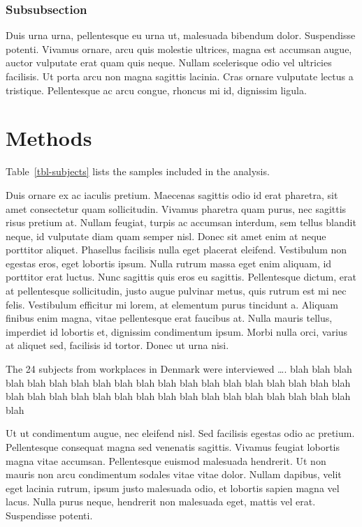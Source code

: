 \documentclass[
  a4paper,
]{scrbook}
\begin{document}
\subsection{Subsubsection}\label{subsubsection}

Duis urna urna, pellentesque eu urna ut, malesuada bibendum dolor.
Suspendisse potenti. Vivamus ornare, arcu quis molestie ultrices, magna
est accumsan augue, auctor vulputate erat quam quis neque. Nullam
scelerisque odio vel ultricies facilisis. Ut porta arcu non magna
sagittis lacinia. Cras ornare vulputate lectus a tristique. Pellentesque
ac arcu congue, rhoncus mi id, dignissim ligula.

\chapter{Methods}\label{methods}

Table~\ref{tbl-subjects} lists the samples included in the analysis.

Duis ornare ex ac iaculis pretium. Maecenas sagittis odio id erat
pharetra, sit amet consectetur quam sollicitudin. Vivamus pharetra quam
purus, nec sagittis risus pretium at. Nullam feugiat, turpis ac accumsan
interdum, sem tellus blandit neque, id vulputate diam quam semper nisl.
Donec sit amet enim at neque porttitor aliquet. Phasellus facilisis
nulla eget placerat eleifend. Vestibulum non egestas eros, eget lobortis
ipsum. Nulla rutrum massa eget enim aliquam, id porttitor erat luctus.
Nunc sagittis quis eros eu sagittis. Pellentesque dictum, erat at
pellentesque sollicitudin, justo augue pulvinar metus, quis rutrum est
mi nec felis. Vestibulum efficitur mi lorem, at elementum purus
tincidunt a. Aliquam finibus enim magna, vitae pellentesque erat
faucibus at. Nulla mauris tellus, imperdiet id lobortis et, dignissim
condimentum ipsum. Morbi nulla orci, varius at aliquet sed, facilisis id
tortor. Donec ut urna nisi.

\label{doc-sampling}
The 24 subjects from workplaces in Denmark were interviewed \ldots. blah
blah blah blah blah blah blah blah blah blah blah blah blah blah blah
blah blah blah blah blah blah blah blah blah blah blah blah blah blah
blah blah blah blah blah blah blah

Ut ut condimentum augue, nec eleifend nisl. Sed facilisis egestas odio
ac pretium. Pellentesque consequat magna sed venenatis sagittis. Vivamus
feugiat lobortis magna vitae accumsan. Pellentesque euismod malesuada
hendrerit. Ut non mauris non arcu condimentum sodales vitae vitae dolor.
Nullam dapibus, velit eget lacinia rutrum, ipsum justo malesuada odio,
et lobortis sapien magna vel lacus. Nulla purus neque, hendrerit non
malesuada eget, mattis vel erat. Suspendisse potenti.
\end{document}
